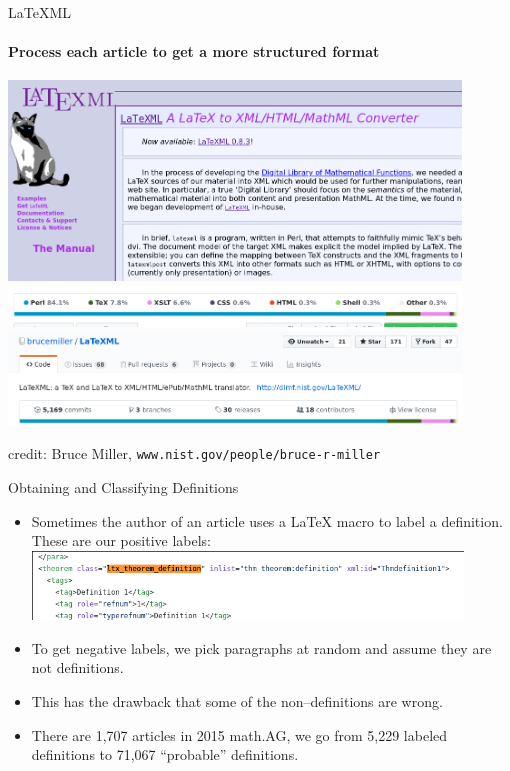 \documentclass[10pt]{beamer}
\begin{document}
\begin{frame}{LaTeXML}
    \framesubtitle{Process each article to get a more structured format}
    \includegraphics[width=0.9\textwidth]{ltxml_website.png}
    \includegraphics[width=0.9\textwidth]{ltxml_github2.png}
    \includegraphics[width=0.9\textwidth]{ltxml_github1.png}
    \begin{flushright}
        {\tiny credit: Bruce Miller, \texttt{www.nist.gov/people/bruce-r-miller}}
    \end{flushright}
\end{frame}

\begin{frame}{Obtaining and Classifying Definitions}
    \begin{itemize}
        \item Sometimes the author of an article uses a \LaTeX{} macro to label a definition. These are our positive labels:
    \includegraphics[width=0.9\textwidth]{ltxml_defin_xml.png}
    \item To get negative labels, we pick paragraphs at random and assume they are not definitions.
        \item This has the drawback that some of the non--definitions are wrong.
    \item There are 1,707 articles in 2015 math.AG, we go from 5,229 labeled definitions to 71,067 ``probable'' definitions.  \end{itemize}
\end{frame}
\end{document}
